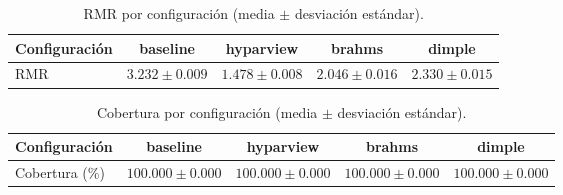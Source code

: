 \begin{table}[h]
\centering
\caption{RMR por configuración (media $\pm$ desviación estándar).}
\begin{tabular}{lcccc}
\hline
Configuración & baseline & hyparview & brahms & dimple \\
\hline
RMR & $3.232 \pm 0.009$ & $1.478 \pm 0.008$ & $2.046 \pm 0.016$ & $2.330 \pm 0.015$ & \\
\hline
\end{tabular}
\end{table}

\begin{table}[h]
\centering
\caption{Cobertura por configuración (media $\pm$ desviación estándar).}
\begin{tabular}{lcccc}
\hline
Configuración & baseline & hyparview & brahms & dimple \\
\hline
Cobertura (\%) & $100.000 \pm 0.000$ & $100.000 \pm 0.000$ & $100.000 \pm 0.000$ & $100.000 \pm 0.000$ & \\
\hline
\end{tabular}
\end{table}
